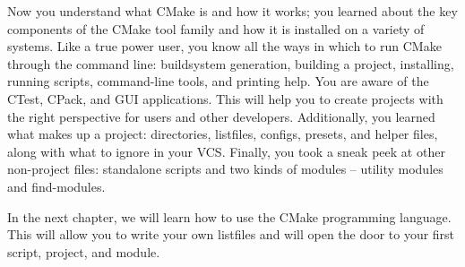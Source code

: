 Now you understand what CMake is and how it works; you learned about the key components of the CMake tool family and how it is installed on a variety of systems. Like a true power user, you know all the ways in which to run CMake through the command line: buildsystem generation, building a project, installing, running scripts, command-line tools, and printing help. You are aware of the CTest, CPack, and GUI applications. This will help you to create projects with the right perspective for users and other developers. Additionally, you learned what makes up a project: directories, listfiles, configs, presets, and helper files, along with what to ignore in your VCS. Finally, you took a sneak peek at other non-project files: standalone scripts and two kinds of modules – utility modules and find-modules.

In the next chapter, we will learn how to use the CMake programming language. This will allow you to write your own listfiles and will open the door to your first script, project, and module.
